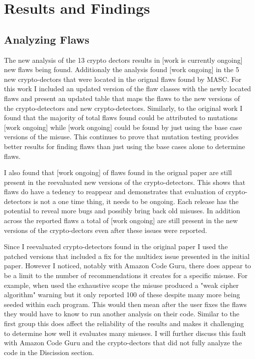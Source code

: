 \chapter{Results and Findings}
\label{chap_results}

\section{Analyzing Flaws}
\label{ch5:sec:flaws}

\begin{sloppypar}
%
\end{sloppypar}


The new analysis of the 13 crypto dectors results in [work is currently ongoing] new flaws being found. Additionaly the analysis found [work ongoing] in the 5 new crypto-dectors that were located in the orignal flaws found by MASC. For this work I included an updated version of the flaw classes with the newly located flaws and present an updated table that maps the flaws to the new versions of the crypto-detectors and new crypto-detectors. Similarly, to the original work I found that the majority of total flaws found could be attributed to mutations [work ongoing] while [work ongoing] could be found by just using the base case versions of the misuse. This continues to prove that mutation testing provides better results for finding flaws than just using the base cases alone to determine flaws.

I also found that [work ongoing] of flaws found in the orignal paper are still present in the reevaluated new versions of the crypto-detectors. This shows that flaws do have a tedency to reappear and demonstrates that evaluation of crypto-detectors is not a one time thing, it needs to be ongoing. Each release has the potential to reveal more bugs and possibly bring back old misuses. In addition across the reported flaws a total of [work ongoing] are still present in the new versions of the crypto-dectors even after these issues were reported.

Since I reevaluated crypto-detectors found in the original paper I used the patched versions that included a fix for the multidex issue presented in the initial paper. However I noticed, notably with Amazon Code Guru, there does appear to be a limit to the number of recommendations it creates for a specific misuse. For example, when used the exhaustive scope the misuse produced a "weak cipher algorithm" warning but it only reported 100 of these despite many more being seeded within each program. This would then mean after the user fixes the flaws they would have to know to run another analysis on their code. Similar to the first group this does affect the reliability of the results and makes it challenging to determine how well it evaluates many misuses. I will further discuss this fault with Amazon Code Guru and the crypto-dectors that did not fully analyze the code in the Discission section. 

